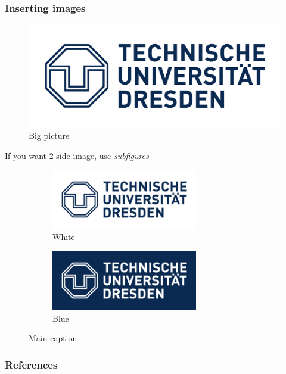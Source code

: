 \documentclass{beamer}
\begin{document}
\begin{frame}
    \frametitle{Inserting images}

    \begin{figure}[h]
        \includegraphics[height=0.3\textheight]{TU_Dresden_Logo_blau_HKS41.jpg}
        \caption{Big picture}
    \end{figure}

    If you want 2 side image, use \textit{subfigures}
    \begin{figure}[h]
        \begin{subfigure}{0.49\textwidth}
            \centering
            \includegraphics[width=0.7\textwidth]{TU_Dresden_Logo_blau_HKS41.jpg}
            \caption{White}
        \end{subfigure}
        \begin{subfigure}{0.49\textwidth}
            \centering
            \includegraphics[width=0.7\textwidth]{TU_Dresden_Logo_invers.jpg}
            \caption{Blue}
        \end{subfigure}
        \caption{Main caption}
    \end{figure}
\end{frame}

\begin{frame}[allowframebreaks]
    \frametitle{References}

    
    

\end{frame}
\end{document}
